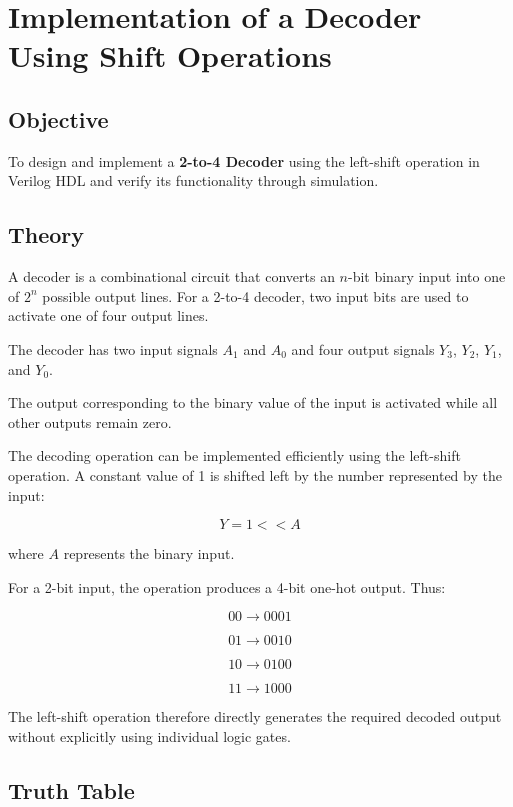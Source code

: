 \documentclass[12pt,a4paper]{report}
\begin{document}

\chapter{Implementation of a Decoder Using Shift Operations}
\label{ch:pdf14}

\section{Objective}

To design and implement a \textbf{2-to-4 Decoder} using the left-shift operation in Verilog HDL and verify its functionality through simulation.

\section{Theory}

A decoder is a combinational circuit that converts an $n$-bit binary input into one of $2^n$ possible output lines. For a 2-to-4 decoder, two input bits are used to activate one of four output lines.

The decoder has two input signals $A_1$ and $A_0$ and four output signals $Y_3$, $Y_2$, $Y_1$, and $Y_0$.

The output corresponding to the binary value of the input is activated while all other outputs remain zero.

The decoding operation can be implemented efficiently using the left-shift operation. A constant value of 1 is shifted left by the number represented by the input:

\[
Y = 1 << A
\]

where $A$ represents the binary input.

For a 2-bit input, the operation produces a 4-bit one-hot output. Thus:

\[
00 \rightarrow 0001
\]

\[
01 \rightarrow 0010
\]

\[
10 \rightarrow 0100
\]

\[
11 \rightarrow 1000
\]

The left-shift operation therefore directly generates the required decoded output without explicitly using individual logic gates.

\section{Truth Table}
\end{document}
